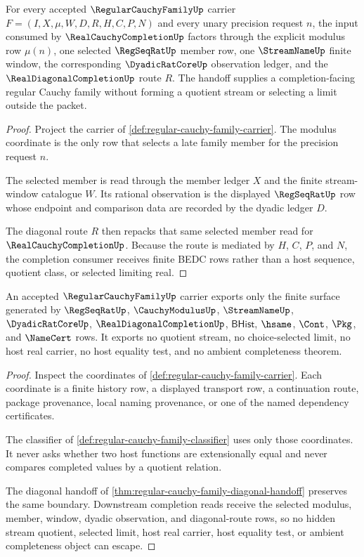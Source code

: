 \begin{theorem}
\label{thm:regular-cauchy-family-diagonal-handoff}
For every accepted $\RegularCauchyFamilyUp$ carrier $F=(I,X,\mu,W,D,R,H,C,P,N)$ and every unary precision request $n$, the input consumed by $\RealCauchyCompletionUp$ factors through the explicit modulus row $\mu(n)$, one selected $\RegSeqRatUp$ member row, one $\StreamNameUp$ finite window, the corresponding $\DyadicRatCoreUp$ observation ledger, and the $\RealDiagonalCompletionUp$ route $R$. The handoff supplies a completion-facing regular Cauchy family without forming a quotient stream or selecting a limit outside the packet.
\end{theorem}
\begin{proof}
Project the carrier of \autoref{def:regular-cauchy-family-carrier}. The modulus coordinate is the only row that selects a late family member for the precision request $n$.

The selected member is read through the member ledger $X$ and the finite stream-window catalogue $W$. Its rational observation is the displayed $\RegSeqRatUp$ row whose endpoint and comparison data are recorded by the dyadic ledger $D$.

The diagonal route $R$ then repacks that same selected member read for $\RealCauchyCompletionUp$. Because the route is mediated by $H$, $C$, $P$, and $N$, the completion consumer receives finite BEDC rows rather than a host sequence, quotient class, or selected limiting real.
\end{proof}

\begin{theorem}
\label{thm:regular-cauchy-family-non-escape-boundary}
An accepted $\RegularCauchyFamilyUp$ carrier exports only the finite surface generated by $\RegSeqRatUp$, $\CauchyModulusUp$, $\StreamNameUp$, $\DyadicRatCoreUp$, $\RealDiagonalCompletionUp$, $\mathsf{BHist}$, $\hsame$, $\Cont$, $\Pkg$, and $\NameCert$ rows. It exports no quotient stream, no choice-selected limit, no host real carrier, no host equality test, and no ambient completeness theorem.
\end{theorem}
\begin{proof}
Inspect the coordinates of \autoref{def:regular-cauchy-family-carrier}. Each coordinate is a finite history row, a displayed transport row, a continuation route, package provenance, local naming provenance, or one of the named dependency certificates.

The classifier of \autoref{def:regular-cauchy-family-classifier} uses only those coordinates. It never asks whether two host functions are extensionally equal and never compares completed values by a quotient relation.

The diagonal handoff of \autoref{thm:regular-cauchy-family-diagonal-handoff} preserves the same boundary. Downstream completion reads receive the selected modulus, member, window, dyadic observation, and diagonal-route rows, so no hidden stream quotient, selected limit, host real carrier, host equality test, or ambient completeness object can escape.
\end{proof}

